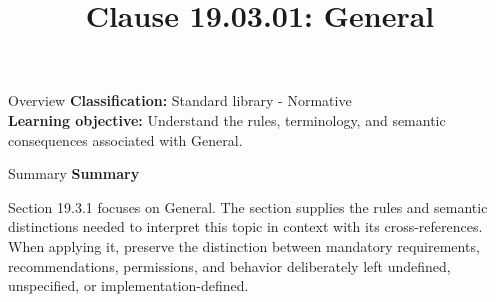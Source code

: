 \documentclass[10pt,letterpaper]{article}
\title{Clause 19.03.01: General}
\author{}
\date{}
\begin{document}
\maketitle
\begin{CornellOverviewBox}{Overview}
\textbf{Classification:} Standard library - Normative\\[2pt]
\textbf{Learning objective:} Understand the rules, terminology, and semantic consequences associated with General.
\end{CornellOverviewBox}\begin{CornellSummaryBox}{Summary}
{\sffamily\bfseries\color{Accent} Summary}\par\vspace{3pt}Section 19.3.1 focuses on General. The section supplies the rules and semantic distinctions needed to interpret this topic in context with its cross-references. When applying it, preserve the distinction between mandatory requirements, recommendations, permissions, and behavior deliberately left undefined, unspecified, or implementation-defined.
\end{CornellSummaryBox}
\end{document}
